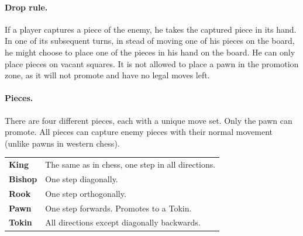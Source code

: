 \documentclass{article}
\begin{document}
{\paragraph{Drop rule.} If a player captures a piece of the enemy, he takes the captured piece in its hand. In one of its subsequent turns, in stead of moving one of his
pieces on the board, he might choose to place one of the pieces in his hand on the board. He can only place pieces on vacant squares. It is not allowed to place a pawn
in the promotion zone, as it will not promote and have no legal moves left.

\paragraph{Pieces.} There are four different pieces, each with a unique move set. Only the pawn can promote. All pieces can capture enemy pieces with their normal movement
(unlike pawns in western chess).\\
\begin{tabular}{l l}
\textbf{King} & The same as in chess, one step in all directions.\\
\textbf{Bishop} & One step diagonally.\\
\textbf{Rook} & One step orthogonally.\\
\textbf{Pawn} & One step forwards. Promotes to a Tokin.\\
\textbf{Tokin} & All directions except diagonally backwards.\\
\end{tabular}

}
{}

\end{document}
